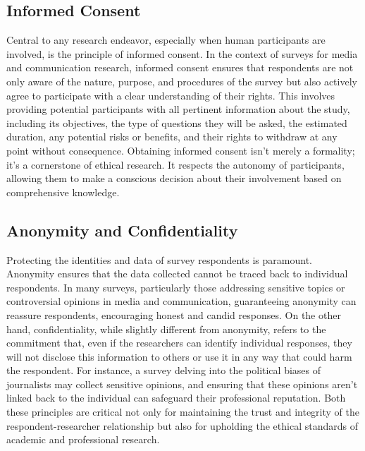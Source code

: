 \documentclass[
  b5paper]{book}
\begin{document}
\hypertarget{informed-consent-1}{%
\subsection*{Informed Consent}\label{informed-consent-1}}

Central to any research endeavor, especially when human participants are involved, is the principle of informed consent. In the context of surveys for media and communication research, informed consent ensures that respondents are not only aware of the nature, purpose, and procedures of the survey but also actively agree to participate with a clear understanding of their rights. This involves providing potential participants with all pertinent information about the study, including its objectives, the type of questions they will be asked, the estimated duration, any potential risks or benefits, and their rights to withdraw at any point without consequence. Obtaining informed consent isn't merely a formality; it's a cornerstone of ethical research. It respects the autonomy of participants, allowing them to make a conscious decision about their involvement based on comprehensive knowledge.

\hypertarget{anonymity-and-confidentiality-1}{%
\subsection*{Anonymity and Confidentiality}\label{anonymity-and-confidentiality-1}}

Protecting the identities and data of survey respondents is paramount. Anonymity ensures that the data collected cannot be traced back to individual respondents. In many surveys, particularly those addressing sensitive topics or controversial opinions in media and communication, guaranteeing anonymity can reassure respondents, encouraging honest and candid responses. On the other hand, confidentiality, while slightly different from anonymity, refers to the commitment that, even if the researchers can identify individual responses, they will not disclose this information to others or use it in any way that could harm the respondent. For instance, a survey delving into the political biases of journalists may collect sensitive opinions, and ensuring that these opinions aren't linked back to the individual can safeguard their professional reputation. Both these principles are critical not only for maintaining the trust and integrity of the respondent-researcher relationship but also for upholding the ethical standards of academic and professional research.
\end{document}
